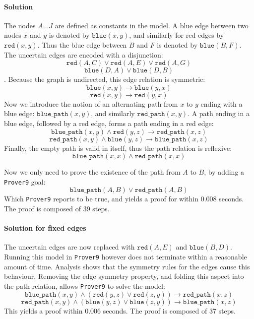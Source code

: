 \documentclass[12pt]{article}
\newcommand{\bimp}{\rightarrow}
\newcommand{\band}{\wedge}
\newcommand{\bor}{\vee}
\newcommand{\provernine}{\texttt{Prover9}\xspace}
\newcommand{\blue}[2]{\mathtt{blue}(#1, #2)}
\newcommand{\red}[2]{\mathtt{red}(#1, #2)}
\newcommand{\bluep}[2]{\mathtt{blue\_path}(#1, #2)}
\newcommand{\redp}[2]{\mathtt{red\_path}(#1, #2)}
\begin{document}
\paragraph{Solution}
The nodes $A \ldots J$ are defined as constants in the model.
A blue edge between two nodes $x$ and $y$ is denoted by $\blue{x}{y}$,
and similarly for red edges by $\red{x}{y}$.
Thus the blue edge between $B$ and $F$ is denoted by $\blue{B}{F}$.
The uncertain edges are encoded with a disjunction:
\[ \red{A}{C} \bor \red{A}{E} \bor \red{A}{G} \]
\[ \blue{D}{A} \bor \blue{D}{B} \].
Because the graph is undirected, this edge relation is symmetric:
\[ \blue{x}{y} \bimp \blue{y}{x} \]
\[ \red{x}{y} \bimp \red{y}{x} \]
Now we introduce the notion of an alternating path from $x$ to $y$ ending with a blue edge:
$\bluep{x}{y}$, and similarly $\redp{x}{y}$.
A path ending in a blue edge, followed by a red edge, forms a path ending in a red edge:
\[ \bluep{x}{y} \band \red{y}{z} \bimp \redp{x}{z} \]
\[ \redp{x}{y} \band \blue{y}{z} \bimp \bluep{x}{z} \]
Finally, the empty path is valid in itself, thus the path relation is reflexive:
\[ \bluep{x}{x} \band \redp{x}{x} \]

Now we only need to prove the existence of the path from $A$ to $B$, by adding
a \provernine goal:
\[ \bluep{A}{B} \bor \redp{A}{B} \]
Which \provernine reports to be true, and yields a proof for within 0.008 seconds.
The proof is composed of 39 steps.

\paragraph{Solution for fixed edges}
The uncertain edges are now replaced with $\red{A}{E}$ and $\blue{B}{D}$.
Running this model in \provernine however does not terminate within a reasonable amount of time.
Analysis shows that the symmetry rules for the edges cause this behaviour.
Removing the edge symmetry property, and folding this aspect into the path relation,
allows \provernine to solve the model:
\[ \bluep{x}{y} \band (\red{y}{z} \bor \red{z}{y}) \bimp \redp{x}{z} \]
\[ \redp{x}{y} \band (\blue{y}{z} \bor \blue{z}{y}) \bimp \bluep{x}{z} \]
This yields a proof within 0.006 seconds.
The proof is composed of 37 steps.
\end{document}
